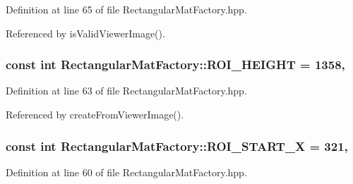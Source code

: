 Definition at line 65 of file Rectangular\-Mat\-Factory.\-hpp.



Referenced by is\-Valid\-Viewer\-Image().

\hypertarget{classmultiscale_1_1analysis_1_1RectangularMatFactory_a66855a873613668d15773b85efea9829}{
\subsubsection[{R\-O\-I\-\_\-\-H\-E\-I\-G\-H\-T}]{\setlength{\rightskip}{0pt plus 5cm}const int Rectangular\-Mat\-Factory\-::\-R\-O\-I\-\_\-\-H\-E\-I\-G\-H\-T = 1358\hspace{0.3cm}{\ttfamily [static]}, {\ttfamily [private]}}}\label{classmultiscale_1_1analysis_1_1RectangularMatFactory_a66855a873613668d15773b85efea9829}


Definition at line 63 of file Rectangular\-Mat\-Factory.\-hpp.



Referenced by create\-From\-Viewer\-Image().

\hypertarget{classmultiscale_1_1analysis_1_1RectangularMatFactory_a90e622e964218af93ca0d024dc3faa41}{
\subsubsection[{R\-O\-I\-\_\-\-S\-T\-A\-R\-T\-\_\-\-X}]{\setlength{\rightskip}{0pt plus 5cm}const int Rectangular\-Mat\-Factory\-::\-R\-O\-I\-\_\-\-S\-T\-A\-R\-T\-\_\-\-X = 321\hspace{0.3cm}{\ttfamily [static]}, {\ttfamily [private]}}}\label{classmultiscale_1_1analysis_1_1RectangularMatFactory_a90e622e964218af93ca0d024dc3faa41}


Definition at line 60 of file Rectangular\-Mat\-Factory.\-hpp.



